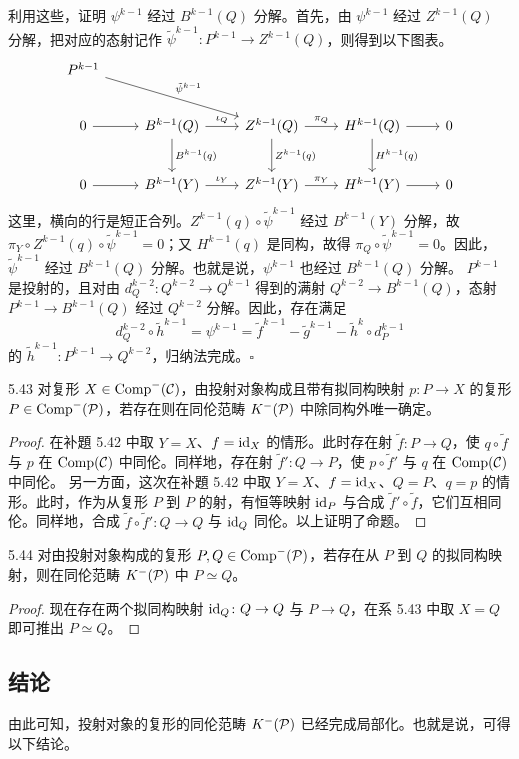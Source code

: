 利用这些，证明 $\psi^{k-1}$ 经过 $B^{k-1}(Q)$ 分解。首先，由 $\psi^{k-1}$ 经过 $Z^{k-1}(Q)$ 分解，把对应的态射记作 $\tilde\psi^{k-1}\colon P^{k-1}\to Z^{k-1}(Q)$，则得到以下图表。
\[\begin{tikzcd}[row sep=2.4em, column sep=2.4em]
P^{k-1} \arrow[drr,"\tilde\psi^{k-1}"] & & & & \\
0 \arrow[r] & B^{k-1}(Q) \arrow[r,"\iota_Q"] \arrow[d,"B^{k-1}(q)"] & Z^{k-1}(Q) \arrow[r,"\pi_Q"] \arrow[d,"Z^{k-1}(q)"] & H^{k-1}(Q) \arrow[r] \arrow[d,"H^{k-1}(q)"] & 0\\
0 \arrow[r] & B^{k-1}(Y) \arrow[r,"\iota_Y"] & Z^{k-1}(Y) \arrow[r,"\pi_Y"] & H^{k-1}(Y) \arrow[r] & 0
\end{tikzcd}\]
这里，横向的行是短正合列。$Z^{k-1}(q)\circ\tilde\psi^{k-1}$ 经过 $B^{k-1}(Y)$ 分解，故 $\pi_Y\circ Z^{k-1}(q)\circ\tilde\psi^{k-1}=0$；又 $H^{k-1}(q)$ 是同构，故得 $\pi_Q\circ\tilde\psi^{k-1}=0$。因此，$\tilde\psi^{k-1}$ 经过 $B^{k-1}(Q)$ 分解。也就是说，$\psi^{k-1}$ 也经过 $B^{k-1}(Q)$ 分解。
$P^{k-1}$ 是投射的，且对由 $d_Q^{k-2}\colon Q^{k-2}\to Q^{k-1}$ 得到的满射 $Q^{k-2}\to B^{k-1}(Q)$，态射 $P^{k-1}\to B^{k-1}(Q)$ 经过 $Q^{k-2}$ 分解。因此，存在满足
\[
  d_Q^{k-2}\circ\tilde h^{k-1}=\psi^{k-1}=\tilde f^{k-1}-\tilde g^{k-1}-\tilde h^k\circ d_P^{k-1}
\]
的 $\tilde h^{k-1}\colon P^{k-1}\to Q^{k-2}$，归纳法完成。\hfill$\square$

\begin{corollary}{5.43}
对复形 $X\in\operatorname{Comp}^-(\mathcal{C})$，由投射对象构成且带有拟同构映射 $p\colon P\to X$ 的复形 $P\in\operatorname{Comp}^-(\mathcal{P})$，若存在则在同伦范畴 $K^-(\mathcal{P})$ 中除同构外唯一确定。
\end{corollary}

\begin{proof}
在补題 5.42 中取 $Y=X$、$f=\mathrm{id}_X$ 的情形。此时存在射 $\tilde f\colon P\to Q$，使 $q\circ\tilde f$ 与 $p$ 在 $\operatorname{Comp}(\mathcal{C})$ 中同伦。同样地，存在射 $\tilde f'\colon Q\to P$，使 $p\circ\tilde f'$ 与 $q$ 在 $\operatorname{Comp}(\mathcal{C})$ 中同伦。
另一方面，这次在补題 5.42 中取 $Y=X$、$f=\mathrm{id}_X$、$Q=P$、$q=p$ 的情形。此时，作为从复形 $P$ 到 $P$ 的射，有恒等映射 $\mathrm{id}_P$ 与合成 $\tilde f'\circ\tilde f$，它们互相同伦。同样地，合成 $\tilde f\circ\tilde f'\colon Q\to Q$ 与 $\mathrm{id}_Q$ 同伦。以上证明了命题。
\end{proof}


\begin{corollary}{5.44}
对由投射对象构成的复形 $P, Q\in\operatorname{Comp}^-(\mathcal{P})$，若存在从 $P$ 到 $Q$ 的拟同构映射，则在同伦范畴 $K^-(\mathcal{P})$ 中 $P\simeq Q$。
\end{corollary}

\begin{proof}
现在存在两个拟同构映射 $\mathrm{id}_Q\colon Q\to Q$ 与 $P\to Q$，在系 5.43 中取 $X=Q$ 即可推出 $P\simeq Q$。
\end{proof}

\subsection{结论}

由此可知，投射对象的复形的同伦范畴 $K^-(\mathcal{P})$ 已经完成局部化。也就是说，可得以下结论。


